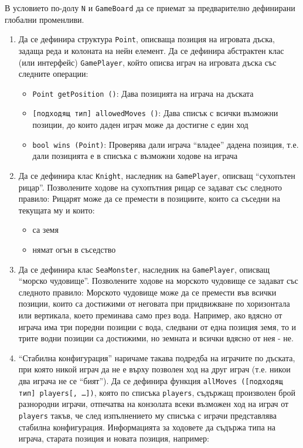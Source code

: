\documentclass[12pt,a4paper]{article}
\newcommand{\code}[1]{\texttt{#1}}
\begin{document}
\begin{enumerate}
	В условието по-долу \code{N} и \code{GameBoard} да се приемат за предварително дефинирани глобални променливи.

	\begin{enumerate}
		\item Да се дефинира структура \code{Point}, описваща позиция на игровата дъска, задаща реда и колоната на нейн елемент. Да се дефинира абстрактен клас (или интерфейс) \code{GamePlayer}, който описва играч на игровата дъска със следните операции:

		\begin{itemize}
			\item \code{Point getPosition ()}: Дава позицията на играча на дъската
			\item \code{[подходящ тип] allowedMoves ()}: Дава списък с всички възможни позиции, до които даден играч може да достигне с един ход
			\item \code{bool wins (Point)}: Проверява дали играча ``владее'' дадена позиция, т.е. дали позицията е в списъка с възможни ходове на играча
				
		\end{itemize}

		\item Да се дефинира клас \code{Knight}, наследник на \code{GamePlayer}, описващ ``сухопътен рицар''. Позволените ходове на сухопътния рицар се задават със следното правило: Рицарят може да се премести в позициите, които са съседни на текущата му и които:
		\begin{itemize}
			\item са земя
			\item нямат огън в съседство
		\end{itemize}

		\item Да се дефинира клас \code{SeaMonster}, наследник на \code{GamePlayer}, описващ ``морско чудовище''. Позволените ходове на морското чудовище се задават със следното правило: Морското чудовище може да се премести във всички позиции, които са достижими от неговата при придвижване по хоризонтала или вертикала, което преминава само през вода. Например, ако вдясно от играча има три поредни позиции с вода, следвани от една позиция земя, то и трите водни позиции са достижими, но земната и всички вдясно от нея - не.


		\item ``Стабилна конфигурация'' наричаме такава подредба на играчите по дъската, при която никой играч да не е върху позволен ход на друг играч (т.е. никои два играча не се ``бият''). Да се дефинира функция \code{allMoves ([подходящ тип] players[, …])}, която по списъка \code{players}, съдържащ произволен брой разнородни играчи, отпечатва на конзолата всеки възможен ход на играч от \code{players} такъв, че след изпълнението му списъка с играчи представлява стабилна конфигурация. Информацията за ходовете да съдържа типа на играча, старата позиция и новата позиция, например:


\end{enumerate}
\end{enumerate}
\end{document}
